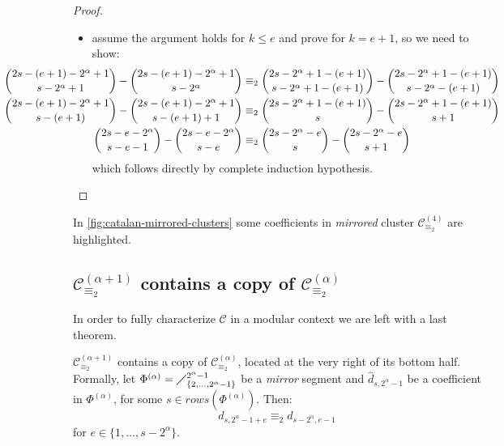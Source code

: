 \begin{proof}
\begin{itemize}
        \item assume the argument holds for $k\leq e$ and prove for $k=e+1$, so we need to show:
            \begin{displaymath}
                \hspace{-3cm}
                \begin{split}
                    {{2s-(e+1)-2^{{\alpha}}+1}\choose{s-2^{{\alpha}}+1}}
                        - {{2s-(e+1)-2^{{\alpha}}+1}\choose{s-2^{{\alpha}}}}
                    &\equiv_{2}
                    {{2s-2^{{\alpha}}+1-(e+1)}\choose{s-2^{{\alpha}}+1-(e+1)}}
                        - {{2s-2^{{\alpha}}+1-(e+1)}\choose{s-2^{{\alpha}}-(e+1)}}\\
                    {{2s-(e+1)-2^{{\alpha}}+1}\choose{s-(e+1)}}
                        - {{2s-(e+1)-2^{{\alpha}}+1}\choose{s-(e+1)+1}}
                    &\equiv_{2}
                    {{2s-2^{{\alpha}}+1-(e+1)}\choose{s}}
                        - {{2s-2^{{\alpha}}+1-(e+1)}\choose{s+1}}\\
                    {{2s-e-2^{{\alpha}}}\choose{s-e-1}}
                        - {{2s-e-2^{{\alpha}}}\choose{s-e}}
                    &\equiv_{2}
                    {{2s-2^{{\alpha}}-e}\choose{s}}
                        - {{2s-2^{{\alpha}}-e}\choose{s+1}}\\
                \end{split}
            \end{displaymath}
            which follows directly by complete induction hypothesis.
\end{itemize}

\end{proof}


In \autoref{fig:catalan-mirrored-clusters} some coefficients in \emph{mirrored}
cluster $\mathcal{C}_{\equiv_{2}}^{(4)}$ are highlighted.

\subsection{$\mathcal{C}_{\equiv_{2}}^{(\alpha+1)}$ 
    contains a copy of $\mathcal{C}_{\equiv_{2}}^{(\alpha)}$}

In order to fully characterize $\mathcal{C}$ in a modular context we are
left with a last theorem.

\begin{theorem}
    $\mathcal{C}_{\equiv_{2}}^{(\alpha+1)}$ 
    contains a copy of $\mathcal{C}_{\equiv_{2}}^{(\alpha)}$,
    located at the very right of its bottom half. Formally, 
    let $\Phi^{(\alpha)}=\diagup_{\lbrace 2,\ldots,2^{\alpha}-1\rbrace}^{2^{\alpha}-1}$
    be a \emph{mirror} segment and $\hat{d}_{s,2^{{\alpha}}-1}$ 
    be a coefficient in $\Phi^{(\alpha)}$, for some $s\in rows\left(\Phi^{(\alpha)}\right)$. Then:
    \begin{displaymath}
        d_{s,2^{{\alpha}}-1+e} \equiv_{2} d_{s-2^{{\alpha}},e-1}
    \end{displaymath}
    for $e\in\lbrace1,\ldots,s-2^{{\alpha}}\rbrace$.
    \label{thm:principal:cluster:copy:containment}
\end{theorem}

